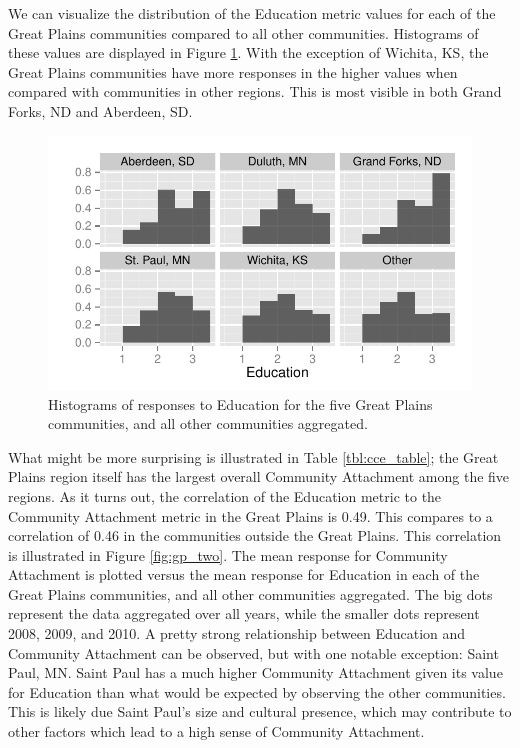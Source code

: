 \documentclass[11pt]{article}\usepackage{knitr}
\begin{document}
We can visualize the distribution of the Education metric values for each of the Great Plains communities compared to all other communities. Histograms of these values are displayed in Figure \ref{fig:gp_one}. With the exception of Wichita, KS, the Great Plains communities have more responses in the higher values when compared with communities in other regions. This is most visible in both Grand Forks, ND and Aberdeen, SD.

\begin{knitrout}
\color{fgcolor}\begin{figure}[H]


{\centering \includegraphics[width=\maxwidth]{figure/gp_one} 

}

\caption[Histograms of responses to Education for the five Great Plains communities, and all other communities aggregated]{Histograms of responses to Education for the five Great Plains communities, and all other communities aggregated.\label{fig:gp_one}}
\end{figure}


\end{knitrout}


What might be more surprising is illustrated in Table \ref{tbl:cce_table}; the Great Plains region itself has the largest overall Community Attachment among the five regions. As it turns out, the correlation of the Education metric to the Community Attachment metric in the Great Plains is 0.49. This compares to a correlation of 0.46 in the communities outside the Great Plains. This correlation is illustrated in Figure \ref{fig:gp_two}. The mean response for Community Attachment is plotted versus the mean response for Education in each of the Great Plains communities, and all other communities aggregated. The big dots represent the data aggregated over all years, while the smaller dots represent 2008, 2009, and 2010. A pretty strong relationship between Education and Community Attachment can be observed, but with one notable exception: Saint Paul, MN. Saint Paul has a much higher Community Attachment given its value for Education than what would be expected by observing the other communities. This is likely due Saint Paul's size and cultural presence, which may contribute to other factors which lead to a high sense of Community Attachment.
\end{document}
